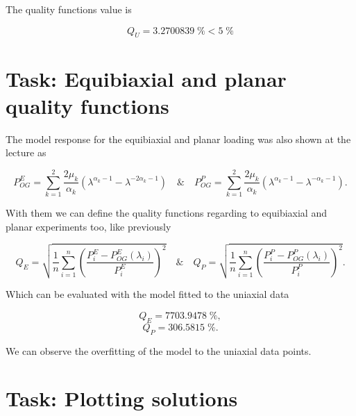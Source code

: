 \documentclass[12pt,a4paper]{article}
\begin{document}
The quality functions value is

$$
Q_U = 3.2700839\;\% < 5\;\%
$$

\section{Task: Equibiaxial and planar quality functions}

The model response for the equibiaxial and planar loading was also shown at the lecture as

$$
P_{OG}^E = 
\sum_{k=1}^2 \frac{2\mu_k}{\alpha_k}(\lambda^{\alpha_k - 1} - \lambda^{-2\alpha_k - 1})
\quad\&\quad
P_{OG}^P = 
\sum_{k=1}^2 \frac{2\mu_k}{\alpha_k}(\lambda^{\alpha_k - 1} - \lambda^{-\alpha_k - 1}).
$$

With them we can define the quality functions regarding to equibiaxial and planar experiments too, like previously

$$
Q_E = \sqrt{\frac{1}{n}\sum_{i=1}^{n} \left(\frac{P^E_i-P^E_{OG}(\lambda_i)}{P^E_i}\right)^2}
\quad\&\quad
Q_P = \sqrt{\frac{1}{n}\sum_{i=1}^{n} \left(\frac{P^P_i-P^P_{OG}(\lambda_i)}{P^P_i}\right)^2}.
$$

Which can be evaluated with the model fitted to the uniaxial data

$$
Q_E = 7703.9478\;\%,
$$
$$
Q_P = 306.5815\;\%.
$$

We can observe the overfitting of the model to the uniaxial data points.

\newpage

\section{Task: Plotting solutions}
\end{document}
